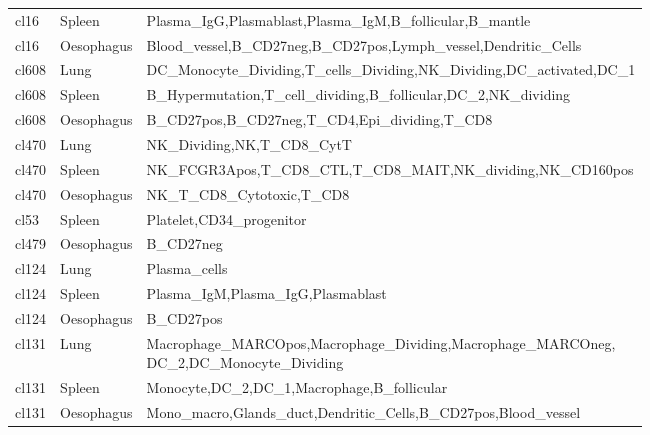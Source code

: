 \begin{table}[pht!]
\begin{tabular}{lll}
  cl16 & Spleen & Plasma\_IgG,Plasmablast,Plasma\_IgM,B\_follicular,B\_mantle \\ 
  cl16 & Oesophagus & Blood\_vessel,B\_CD27neg,B\_CD27pos,Lymph\_vessel,Dendritic\_Cells \\ 
  cl608 & Lung & DC\_Monocyte\_Dividing,T\_cells\_Dividing,NK\_Dividing,DC\_activated,DC\_1 \\ 
  cl608 & Spleen & B\_Hypermutation,T\_cell\_dividing,B\_follicular,DC\_2,NK\_dividing \\ 
  cl608 & Oesophagus & B\_CD27pos,B\_CD27neg,T\_CD4,Epi\_dividing,T\_CD8 \\ 
  cl470 & Lung & NK\_Dividing,NK,T\_CD8\_CytT \\ 
  cl470 & Spleen & NK\_FCGR3Apos,T\_CD8\_CTL,T\_CD8\_MAIT,NK\_dividing,NK\_CD160pos \\ 
  cl470 & Oesophagus & NK\_T\_CD8\_Cytotoxic,T\_CD8 \\ 
  cl53 & Spleen & Platelet,CD34\_progenitor \\ 
  cl479 & Oesophagus & B\_CD27neg \\ 
  cl124 & Lung & Plasma\_cells \\ 
  cl124 & Spleen & Plasma\_IgM,Plasma\_IgG,Plasmablast \\ 
  cl124 & Oesophagus & B\_CD27pos \\ 
  cl131 & Lung & \specialcell[t]{Macrophage\_MARCOpos,Macrophage\_Dividing,Macrophage\_MARCOneg,\\DC\_2,DC\_Monocyte\_Dividing} \\ 
  cl131 & Spleen & Monocyte,DC\_2,DC\_1,Macrophage,B\_follicular \\ 
  cl131 & Oesophagus & Mono\_macro,Glands\_duct,Dendritic\_Cells,B\_CD27pos,Blood\_vessel \\ 
  \bottomrule
\end{tabular}
\end{table}  
  
